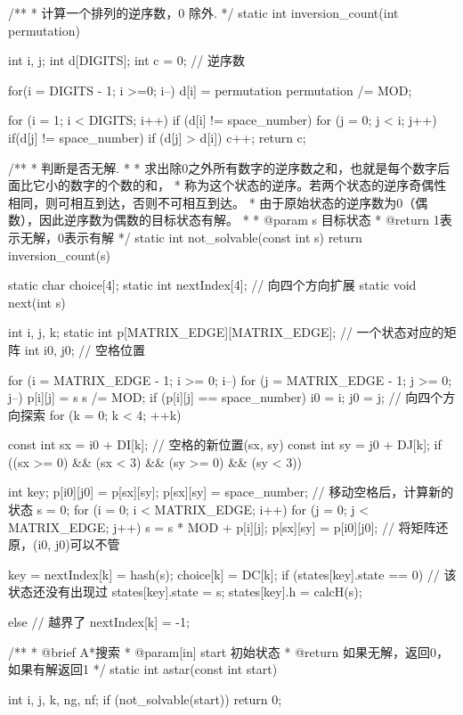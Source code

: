 \begin{Codex}[label=eight_digits_astar.c]
/**
 * 计算一个排列的逆序数，0 除外.
 */
static int inversion_count(int permutation) {
    int i, j;
    int d[DIGITS];
    int c = 0; // 逆序数

    for(i = DIGITS - 1; i >=0; i--) {
        d[i] = permutation %
        permutation /= MOD;
    }
    
    for (i = 1; i < DIGITS; i++)  if (d[i] != space_number) {
        for (j = 0; j < i; j++) {
            if(d[j] != space_number) {
                if (d[j] > d[i]) {
                    c++;
                }
            }
        }
    }
    return c;
}

/**
 * 判断是否无解.
 *
 * 求出除0之外所有数字的逆序数之和，也就是每个数字后面比它小的数字的个数的和，
 * 称为这个状态的逆序。若两个状态的逆序奇偶性相同，则可相互到达，否则不可相互到达。
 * 由于原始状态的逆序数为0（偶数），因此逆序数为偶数的目标状态有解。
 *
 * @param s 目标状态
 * @return 1表示无解，0表示有解
 */
static int not_solvable(const int s) {
    return inversion_count(s) %
}


static char choice[4];
static int nextIndex[4];
// 向四个方向扩展
static void next(int s) {
    int i, j, k;
    static int p[MATRIX_EDGE][MATRIX_EDGE]; // 一个状态对应的矩阵
    int i0, j0;  // 空格位置

    for (i = MATRIX_EDGE - 1; i >= 0; i--) {
        for (j = MATRIX_EDGE - 1; j >= 0; j--) {
            p[i][j] = s %
            s /= MOD;
            if (p[i][j] == space_number) {
                i0 = i;
                j0 = j;
            }
        }
    }
    // 向四个方向探索
    for (k = 0; k < 4; ++k) {
        const int sx = i0 + DI[k]; // 空格的新位置(sx, sy)
        const int sy = j0 + DJ[k];
        if ((sx >= 0) && (sx < 3) && (sy >= 0) && (sy < 3)) {
            int key;
            p[i0][j0] = p[sx][sy];
            p[sx][sy] = space_number;
            // 移动空格后，计算新的状态
            s = 0;
            for (i = 0; i < MATRIX_EDGE; i++)
                for (j = 0; j < MATRIX_EDGE; j++)
                    s = s * MOD + p[i][j];
            p[sx][sy] = p[i0][j0]; // 将矩阵还原，(i0, j0)可以不管
            
            key = nextIndex[k] = hash(s);
            choice[k] = DC[k];
            if (states[key].state == 0) { // 该状态还没有出现过
                states[key].state = s;
                states[key].h = calcH(s);
            }
        } else {// 越界了
            nextIndex[k] = -1;
        }
    }
}

/**
 * @brief A*搜索
 * @param[in] start 初始状态
 * @return 如果无解，返回0，如果有解返回1
 */
static int astar(const int start) {
    int i, j, k, ng, nf;
    if (not_solvable(start)) return 0;

}
\end{Codex}
